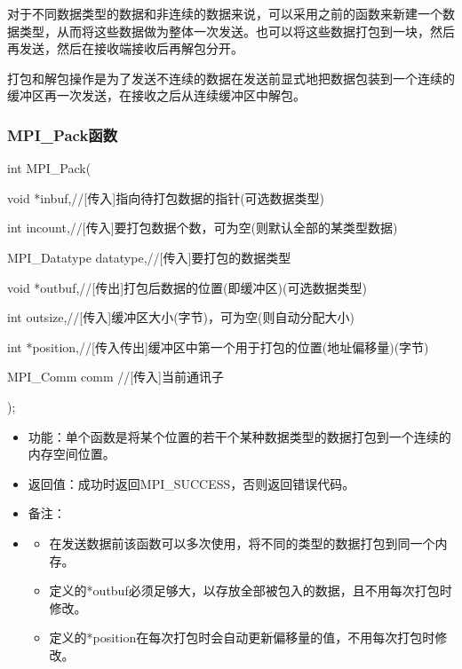 \documentclass[UTF8]{article}%
\begin{document}
对于不同数据类型的数据和非连续的数据来说，可以采用之前的函数来新建一个数据类型，从而将这些数据做为整体一次发送。也可以将这些数据打包到一块，然后再发送，然后在接收端接收后再解包分开。

打包和解包操作是为了发送不连续的数据在发送前显式地把数据包装到一个连续的缓冲区再一次发送，在接收之后从连续缓冲区中解包。

\subsubsection{MPI\_Pack函数}

int MPI\_Pack(

    \qquad void            *inbuf,//[传入]指向待打包数据的指针(可选数据类型) 

    \qquad int             incount,//[传入]要打包数据个数，可为空(则默认全部的某类型数据)

    \qquad MPI\_Datatype   datatype,//[传入]要打包的数据类型

    \qquad void            *outbuf,//[传出]打包后数据的位置(即缓冲区)(可选数据类型)

    \qquad int             outsize,//[传入]缓冲区大小(字节)，可为空(则自动分配大小)

    \qquad int             *position,//[传入传出]缓冲区中第一个用于打包的位置(地址偏移量)(字节)

    \qquad MPI\_Comm       comm //[传入]当前通讯子
    
);

\begin{itemize}
    \item 功能：单个函数是将某个位置的若干个某种数据类型的数据打包到一个连续的内存空间位置。
    \item 返回值：成功时返回MPI\_SUCCESS，否则返回错误代码。
    \item 备注：
    \item 
    {
        \begin{itemize}
            \item 在发送数据前该函数可以多次使用，将不同的类型的数据打包到同一个内存。
            \item 定义的*outbuf必须足够大，以存放全部被包入的数据，且不用每次打包时修改。
            \item 定义的*position在每次打包时会自动更新偏移量的值，不用每次打包时修改。
        \end{itemize}
    }

\end{itemize}
\end{document}
